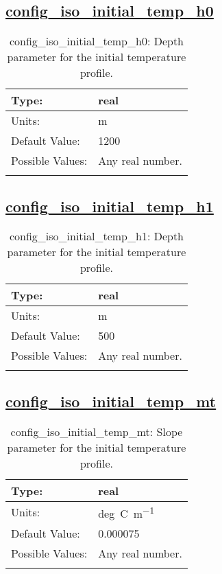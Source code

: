 \subsection[config\_iso\_initial\_temp\_h0]{\hyperref[sec:nm_tab_iso]{config\_iso\_initial\_temp\_h0}}
\label{subsec:nm_sec_config_iso_initial_temp_h0}
\begin{center}
\begin{longtable}{| p{2.0in} || p{4.0in} |}
    \hline
    Type: & real \\
    \hline
    Units: & \si{m} \\
    \hline
    Default Value: & 1200 \\
    \hline
    Possible Values: & Any real number. \\
    \hline
    \caption{config\_iso\_initial\_temp\_h0: Depth parameter for the initial temperature profile.}
\end{longtable}
\end{center}
\subsection[config\_iso\_initial\_temp\_h1]{\hyperref[sec:nm_tab_iso]{config\_iso\_initial\_temp\_h1}}
\label{subsec:nm_sec_config_iso_initial_temp_h1}
\begin{center}
\begin{longtable}{| p{2.0in} || p{4.0in} |}
    \hline
    Type: & real \\
    \hline
    Units: & \si{m} \\
    \hline
    Default Value: & 500 \\
    \hline
    Possible Values: & Any real number. \\
    \hline
    \caption{config\_iso\_initial\_temp\_h1: Depth parameter for the initial temperature profile.}
\end{longtable}
\end{center}
\subsection[config\_iso\_initial\_temp\_mt]{\hyperref[sec:nm_tab_iso]{config\_iso\_initial\_temp\_mt}}
\label{subsec:nm_sec_config_iso_initial_temp_mt}
\begin{center}
\begin{longtable}{| p{2.0in} || p{4.0in} |}
    \hline
    Type: & real \\
    \hline
    Units: & \si{deg.C.m^{-1}} \\
    \hline
    Default Value: & 0.000075 \\
    \hline
    Possible Values: & Any real number. \\
    \hline
    \caption{config\_iso\_initial\_temp\_mt: Slope parameter for the initial temperature profile.}
\end{longtable}
\end{center}
